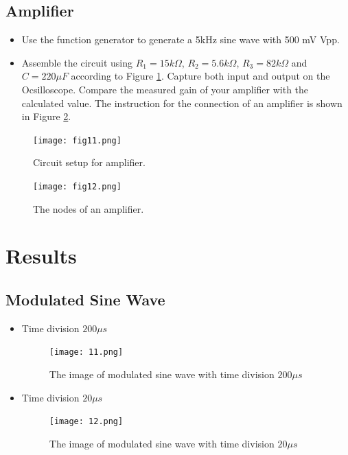 \documentclass[utf8]{article}
\begin{document}
\subsection{Amplifier}
\begin{itemize}
\item  Use the function generator to generate a 5kHz sine wave with 500 mV Vpp.
\item Assemble the circuit using $R_1 = 15k\Omega$, $R_2 = 5.6k\Omega$, $R_3 = 82k\Omega$ and $C = 220\mu F$ according to Figure \ref{setup2}. Capture both input and output on the Ocsilloscope. Compare the measured gain of your amplifier with the calculated value. The instruction for the connection of an amplifier is shown in Figure \ref{amp}.
\end{itemize}
\begin{figure}[htbp]
	\centering
	\texttt{[image: fig11.png]}
	\caption{Circuit setup for amplifier.}
	\label{setup2}
\end{figure}
\begin{figure}[htbp]
	\centering
	\texttt{[image: fig12.png]}
	\caption{The nodes of an amplifier.}
	\label{amp}
\end{figure}

\section{Results}
\subsection{Modulated Sine Wave}
\begin{itemize}
\item Time division $200\mu s$ 
\begin{figure}[htbp]
	\centering
		\texttt{[image: 11.png]}
	\caption{The image of modulated sine wave with time division $200\mu s$}
	\label{fig-1-1}
\end{figure}

\item Time division $20\mu s$ 
\begin{figure}[htbp]
	\centering
		\texttt{[image: 12.png]}
	\caption{The image of modulated sine wave with time division $20\mu s$}
	\label{fig-1-2}
\end{figure}
\end{itemize}
\end{document}

